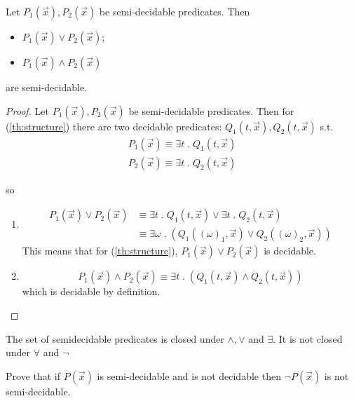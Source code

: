 \begin{theorem}
  Let $ P_1(\vec{x}), P_2(\vec{x}) $ be semi-decidable predicates. Then
  \begin{itemize}
  \item $  P_1(\vec{x}) \lor P_2(\vec{x}) $;
  \item $ P_1(\vec{x}) \land P_2(\vec{x}) $
  \end{itemize}
  are semi-decidable.

  \begin{proof}
    Let $ P_1(\vec{x}), P_2(\vec{x}) $ be semi-decidable
    predicates. Then for (\ref{th:structure}) there are two
    decidable predicates: \( Q_1(t, \vec{x}), Q_2(t, \vec{x})\) s.t.
    \begin{gather*}
      P_1(\vec{x}) \equiv \exists t \; . \; Q_1(t, \vec{x}) \\
      P_2(\vec{x}) \equiv \exists t \; . \; Q_2(t, \vec{x})
    \end{gather*}

    so
    \begin{enumerate}[label=(\arabic*)]
    \item
      \[
        \begin{split}
          P_1(\vec{x}) \lor P_2(\vec{x}) &\equiv \exists t \; . \;
          Q_1(t, \vec{x}) \lor \exists t \; . \; Q_2(t, \vec{x}) \\
          &\equiv \exists \omega \; . \; (Q_1((\omega)_1, \vec{x})
          \lor Q_2((\omega)_2, \vec{x}))
        \end{split}
      \]
      This means that for (\ref{th:structure}),
      $P_1(\vec{x}) \lor P_2(\vec{x})$ is decidable.

    \item
      \[
        P_1(\vec{x}) \land P_2(\vec{x}) \equiv \exists t \; . \;
        (Q_1(t, \vec{x}) \land Q_2(t, \vec{x}))
      \]
      which is decidable by definition.
    \end{enumerate}
  \end{proof}
\end{theorem}

\begin{observation}
  The set of semidecidable predicates is closed under $\land, \lor$
  and $\exists$. It is not closed under $\forall$ and $\lnot$
\end{observation}

\begin{exercise}
  Prove that if $ P(\vec{x}) $ is semi-decidable and is not decidable
  then $ \lnot P(\vec{x}) $ is not semi-decidable.
\end{exercise}

